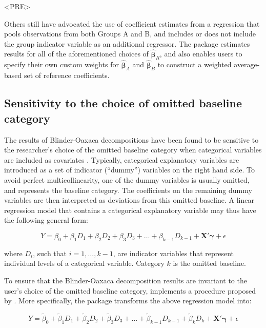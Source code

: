 <PRE>\documentclass[nojss]{jss}
\begin{document}
Others still have advocated the use of coefficient estimates from a regression that pools observations from both Groups A and B, and includes \citep{Jann2008} or does not include \citep{Neumark1988} the group indicator variable as an additional regressor. The  package estimates results for all of the aforementioned choices of $\boldsymbol{\hat{\beta}}_{R}$, and also enables users to specify their own custom weights for $\boldsymbol{\hat{\beta}}_{A}$ and $\boldsymbol{\hat{\beta}}_{B}$ to construct a weighted average-based set of reference coefficients.

\subsection[Sensitivity to the choice of omitted baseline category]{Sensitivity to the choice of omitted baseline category}

The results of Blinder-Oaxaca decompositions have been found to be sensitive to the researcher's choice of the omitted baseline category when categorical variables are included as covariates \citep{OaxacaRansom1999}. Typically, categorical explanatory variables are introduced as a set of indicator (``dummy'') variables on the right hand side. To avoid perfect multicollinearity, one of the dummy variables is usually omitted, and represents the baseline category. The coefficients on the remaining dummy variables are then interpreted as deviations from this omitted baseline. A linear regression model that contains a categorical explanatory variable may thus have the following general form:

\begin{equation}\label{adjust}
Y = \beta_{0} + \beta_{1}D_{1} + \beta_{2}D_{2} + \beta_{3}D_{3} + \dots + \beta_{k-1}D_{k-1} + \boldsymbol{X}'\boldsymbol{\gamma} + \epsilon
\end{equation}

where $D_{i}$, such that $i = 1, \dots, k-1$, are indicator variables that represent individual levels of a categorical variable. Category $k$ is the omitted baseline. 

To ensure that the Blinder-Oaxaca decomposition results are invariant to the user's choice of the omitted baseline category,  implements a procedure proposed by \citet{GardeazabalUgidos2004}. More specifically, the package transforms the above regression model into:

\begin{equation}\label{adjust}
Y = \tilde{\beta}_{0} + \tilde{\beta}_{1}D_{1} + \tilde{\beta}_{2}D_{2} + \tilde{\beta}_{3}D_{3} + \dots + \tilde{\beta}_{k-1}D_{k-1} + \tilde{\beta}_{k}D_{k} + \boldsymbol{X}'\boldsymbol{\gamma} + \epsilon
\end{equation}
\end{document}

